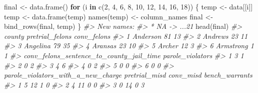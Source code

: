\documentclass[
]{krantz}
\makeatletter
\newenvironment{Shaded}{\begin{snugshade}}{\end{snugshade}}
\newcommand{\CommentTok}[1]{\textcolor[rgb]{0.37,0.37,0.37}{\textit{#1}}}
\newcommand{\ControlFlowTok}[1]{\textcolor[rgb]{0.27,0.27,0.27}{\textbf{#1}}}
\newcommand{\DecValTok}[1]{\textcolor[rgb]{0.06,0.06,0.06}{#1}}
\newcommand{\FunctionTok}[1]{\textcolor[rgb]{0,0,0}{#1}}
\newcommand{\NormalTok}[1]{#1}
\newcommand{\OtherTok}[1]{\textcolor[rgb]{0.37,0.37,0.37}{#1}}
\newenvironment{kframe}{%
\medskip{}
\setlength{\fboxsep}{.8em}
 \def\at@end@of@kframe{}%
 \ifinner\ifhmode%
  \def\at@end@of@kframe{\end{minipage}}%
  \begin{minipage}{\columnwidth}%
 \fi\fi%
 \def\FrameCommand##1{\hskip\@totalleftmargin \hskip-\fboxsep
 \colorbox{shadecolor}{##1}\hskip-\fboxsep
     \hskip-\linewidth \hskip-\@totalleftmargin \hskip\columnwidth}%
 \MakeFramed {\advance\hsize-\width
   \@totalleftmargin\z@ \linewidth\hsize
   \@setminipage}}%
 {\par\unskip\endMakeFramed%
 \at@end@of@kframe}
\renewenvironment{Shaded}{\begin{kframe}}{\end{kframe}}
\makeatother
\begin{document}
\begin{Shaded}
\begin{Highlighting}[]
\NormalTok{final }\OtherTok{\textless{}{-}} \FunctionTok{data.frame}\NormalTok{()}
\ControlFlowTok{for}\NormalTok{ (i }\ControlFlowTok{in} \FunctionTok{c}\NormalTok{(}\DecValTok{2}\NormalTok{, }\DecValTok{4}\NormalTok{, }\DecValTok{6}\NormalTok{, }\DecValTok{8}\NormalTok{, }\DecValTok{10}\NormalTok{, }\DecValTok{12}\NormalTok{, }\DecValTok{14}\NormalTok{, }\DecValTok{16}\NormalTok{, }\DecValTok{18}\NormalTok{)) \{}
\NormalTok{  temp        }\OtherTok{\textless{}{-}}\NormalTok{ data[[i]]}
\NormalTok{  temp        }\OtherTok{\textless{}{-}} \FunctionTok{data.frame}\NormalTok{(temp)}
  \FunctionTok{names}\NormalTok{(temp) }\OtherTok{\textless{}{-}}\NormalTok{ column\_names}
\NormalTok{  final       }\OtherTok{\textless{}{-}} \FunctionTok{bind\_rows}\NormalTok{(final, temp)}
\NormalTok{\}}
\CommentTok{\#\textgreater{} New names:}
\CommentTok{\#\textgreater{} * NA {-}\textgreater{} ...21}
\FunctionTok{head}\NormalTok{(final)}
\CommentTok{\#\textgreater{}      county pretrial\_felons conv\_felons}
\CommentTok{\#\textgreater{} 1  Anderson              81          13}
\CommentTok{\#\textgreater{} 2   Andrews              23          11}
\CommentTok{\#\textgreater{} 3  Angelina              79          35}
\CommentTok{\#\textgreater{} 4   Aransas              23          10}
\CommentTok{\#\textgreater{} 5    Archer              12           3}
\CommentTok{\#\textgreater{} 6 Armstrong               1           1}
\CommentTok{\#\textgreater{}   conv\_felons\_sentence\_to\_county\_jail\_time parole\_violators}
\CommentTok{\#\textgreater{} 1                                        3                1}
\CommentTok{\#\textgreater{} 2                                        0                2}
\CommentTok{\#\textgreater{} 3                                        4                6}
\CommentTok{\#\textgreater{} 4                                        0                2}
\CommentTok{\#\textgreater{} 5                                        0                0}
\CommentTok{\#\textgreater{} 6                                        0                0}
\CommentTok{\#\textgreater{}   parole\_violators\_with\_a\_new\_charge pretrial\_misd conv\_misd bench\_warrants}
\CommentTok{\#\textgreater{} 1                                  5            12         1              0}
\CommentTok{\#\textgreater{} 2                                  4            11         0              0}
\CommentTok{\#\textgreater{} 3                                  0            14         0              3}

\end{Highlighting}
\end{Shaded}
\end{document}
